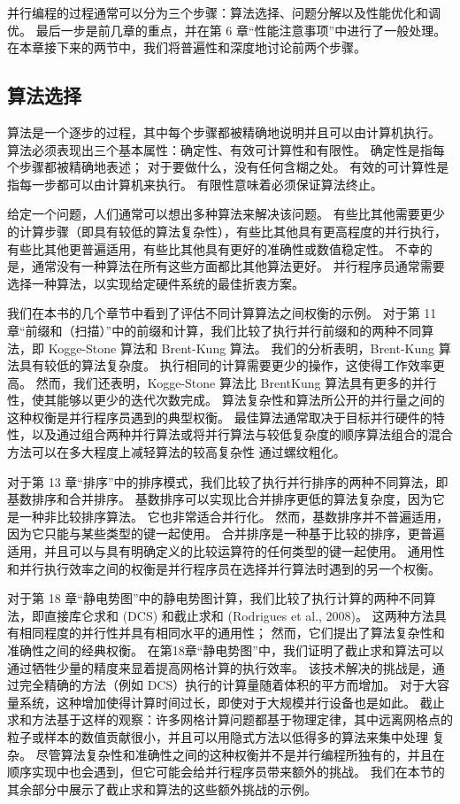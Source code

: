 并行编程的过程通常可以分为三个步骤：算法选择、问题分解以及性能优化和调优。 最后一步是前几章的重点，并在第 6 章“性能注意事项”中进行了一般处理。 在本章接下来的两节中，我们将普遍性和深度地讨论前两个步骤。

\subsection{算法选择}
算法是一个逐步的过程，其中每个步骤都被精确地说明并且可以由计算机执行。 算法必须表现出三个基本属性：确定性、有效可计算性和有限性。 确定性是指每个步骤都被精确地表述； 对于要做什么，没有任何含糊之处。 有效的可计算性是指每一步都可以由计算机来执行。 有限性意味着必须保证算法终止。

给定一个问题，人们通常可以想出多种算法来解决该问题。 有些比其他需要更少的计算步骤（即具有较低的算法复杂性），有些比其他具有更高程度的并行执行，有些比其他更普遍适用，有些比其他具有更好的准确性或数值稳定性。 不幸的是，通常没有一种算法在所有这些方面都比其他算法更好。 并行程序员通常需要选择一种算法，以实现给定硬件系统的最佳折衷方案。

我们在本书的几个章节中看到了评估不同计算算法之间权衡的示例。 对于第 11 章“前缀和（扫描）”中的前缀和计算，我们比较了执行并行前缀和的两种不同算法，即 Kogge-Stone 算法和 Brent-Kung 算法。 我们的分析表明，Brent-Kung 算法具有较低的算法复杂度。 执行相同的计算需要更少的操作，这使得工作效率更高。 然而，我们还表明，Kogge-Stone 算法比 BrentKung 算法具有更多的并行性，使其能够以更少的迭代次数完成。 算法复杂性和算法所公开的并行量之间的这种权衡是并行程序员遇到的典型权衡。 最佳算法通常取决于目标并行硬件的特性，以及通过组合两种并行算法或将并行算法与较低复杂度的顺序算法组合的混合方法可以在多大程度上减轻算法的较高复杂性 通过螺纹粗化。

对于第 13 章“排序”中的排序模式，我们比较了执行并行排序的两种不同算法，即基数排序和合并排序。 基数排序可以实现比合并排序更低的算法复杂度，因为它是一种非比较排序算法。 它也非常适合并行化。 然而，基数排序并不普遍适用，因为它只能与某些类型的键一起使用。 合并排序是一种基于比较的排序，更普遍适用，并且可以与具有明确定义的比较运算符的任何类型的键一起使用。 通用性和并行执行效率之间的权衡是并行程序员在选择并行算法时遇到的另一个权衡。

对于第 18 章“静电势图”中的静电势图计算，我们比较了执行计算的两种不同算法，即直接库仑求和 (DCS) 和截止求和 (Rodrigues et al., 2008)。 这两种方法具有相同程度的并行性并具有相同水平的通用性； 然而，它们提出了算法复杂性和准确性之间的经典权衡。 在第18章“静电势图”中，我们证明了截止求和算法可以通过牺牲少量的精度来显着提高网格计算的执行效率。 该技术解决的挑战是，通过完全精确的方法（例如 DCS）执行的计算量随着体积的平方而增加。 对于大容量系统，这种增加使得计算时间过长，即使对于大规模并行设备也是如此。 截止求和方法基于这样的观察：许多网格计算问题都基于物理定律，其中远离网格点的粒子或样本的数值贡献很小，并且可以用隐式方法以低得多的算法来集中处理 复杂。 尽管算法复杂性和准确性之间的这种权衡并不是并行编程所独有的，并且在顺序实现中也会遇到，但它可能会给并行程序员带来额外的挑战。 我们在本节的其余部分中展示了截止求和算法的这些额外挑战的示例。

